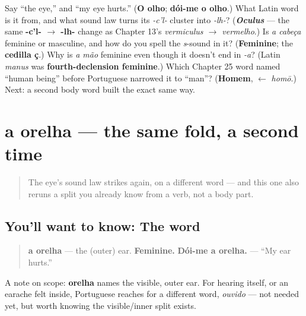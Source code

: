 \begin{tcolorbox}[breakable,colback=teal!4,colframe=teal!35!black,title={Before you move on}]
Say \textquotedblleft{}the eye,\textquotedblright{} and \textquotedblleft{}my eye hurts.\textquotedblright{} (\textbf{O olho}; \textbf{dói-me o olho}.) What Latin word is it from, and what sound law turns its \emph{-c'l-} cluster into \emph{-lh-}? (\emph{\textbf{Oculus}} — the same \textbf{-c'l- $\to$ -lh-} change as Chapter 13's \emph{vermiculus $\to$ vermelho}.) Is \emph{a cabeça} feminine or masculine, and how do you spell the \emph{s}-sound in it? (\textbf{Feminine}; the \textbf{cedilla ç}.) Why is \emph{a mão} feminine even though it doesn't end in \emph{-a}? (Latin \emph{manus} was \textbf{fourth-declension feminine}.) Which Chapter 25 word named \textquotedblleft{}human being\textquotedblright{} before Portuguese narrowed it to \textquotedblleft{}man\textquotedblright{}? (\textbf{Homem}, $\leftarrow$ \emph{homō}.) Next: a second body word built the exact same way.
\end{tcolorbox}
\section[a orelha]{a orelha — the same fold, a second time}

\label{lesson:PT-C26-orelha}



\begin{quote}
The eye's sound law strikes again, on a different word — and this one also reruns a split you already know from a verb, not a body part.
\end{quote}

\subsection*{You'll want to know: The word}
\begin{quote}
\textbf{a orelha} — the (outer) ear. \textbf{Feminine.} \textbf{Dói-me a orelha.} — \textquotedblleft{}My ear hurts.\textquotedblright{}
\end{quote}

A note on scope: \textbf{orelha} names the visible, outer ear. For hearing itself, or an earache felt inside, Portuguese reaches for a different word, \emph{ouvido} — not needed yet, but worth knowing the visible/inner split exists.

